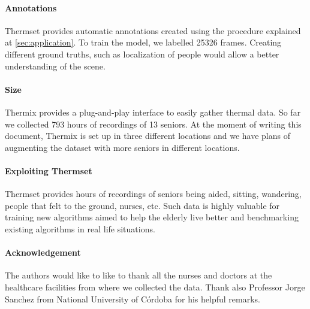 \documentclass[oneside, twocolumn]{article}
\newcommand\TotalHoursOfRecording{793}
\newcommand\NumberOfPeople{13}
\begin{document}
\paragraph{Annotations}
Thermset provides automatic annotations created using the procedure explained at \autoref{sec:application}.
To train the model, we labelled 25326 frames. Creating different ground truths, such as localization of
people would allow a better understanding of the scene.
\paragraph{Size}
Thermix provides a plug-and-play interface to easily gather thermal data. So far we collected \TotalHoursOfRecording{}
hours of recordings of \NumberOfPeople{} seniors. At the moment of writing this document, Thermix is set up in
three different locations and we have plans of augmenting the dataset with more seniors in different locations.

\paragraph{Exploiting Thermset}
Thermset provides hours of recordings of seniors being aided, sitting, wandering, people that felt to the
ground, nurses, etc. Such data is highly valuable for training new algorithms aimed to help the elderly live
better and benchmarking existing algorithms in real life situations.
\paragraph{Acknowledgement}
The authors would like to like to thank all the nurses and doctors at the healthcare facilities from where we
collected the data. Thank also Professor Jorge Sanchez from National University of C\'ordoba for his helpful remarks.

\end{document}

